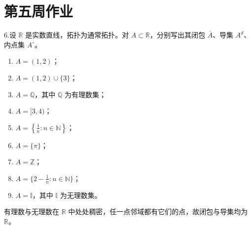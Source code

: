 \section{第五周作业}
\begin{exercise}
6.设 $\mathbb{R}$ 是实数直线，拓扑为通常拓扑。对 $A \subset \mathbb{R}$，分别写出其闭包 $\overline{A}$、导集 $A^{d}$、内点集 $A^{\circ}$。

\begin{enumerate}[(1)]
  \item $A = (1,2)$；
  \item $A = (1,2)\cup\{3\}$；
  \item $A = \mathbb{Q}$，其中 $\mathbb{Q}$ 为有理数集；
  \item $A = [3,4)$；
  \item $A = \left\{\tfrac{1}{n} : n\in\mathbb{N}\right\}$；
  \item $A = \{\pi\}$；
  \item $A = \mathbb{Z}$；
  \item $A = \{2 - \tfrac{1}{n} : n\in\mathbb{N}\}$；
  \item $A = \mathbb{I}$，其中 $\mathbb{I}$ 为无理数集。
\end{enumerate}

\end{exercise}
\begin{dxtips}有理数与无理数在 $\mathbb{R}$ 中处处稠密，任一点邻域都有它们的点，故闭包与导集均为 $\mathbb{R}$。
\end{dxtips}
